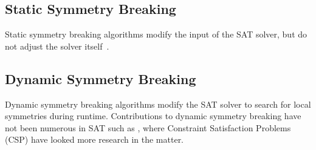 		
		\subsection{Static Symmetry Breaking}
			Static symmetry breaking algorithms modify the input of the SAT solver, but do not adjust the solver itself~\cite{sakallah2009symmetry}.
			
		\subsection{Dynamic Symmetry Breaking}
			Dynamic symmetry breaking algorithms modify the SAT solver to search for local symmetries during runtime.
			Contributions to dynamic symmetry breaking have not been numerous in SAT such as \cite{sabharwal2005symchaff},
			where Constraint Satisfaction Problems (CSP) have looked more research in the matter. 	

	\nocite{*} %
	
	

